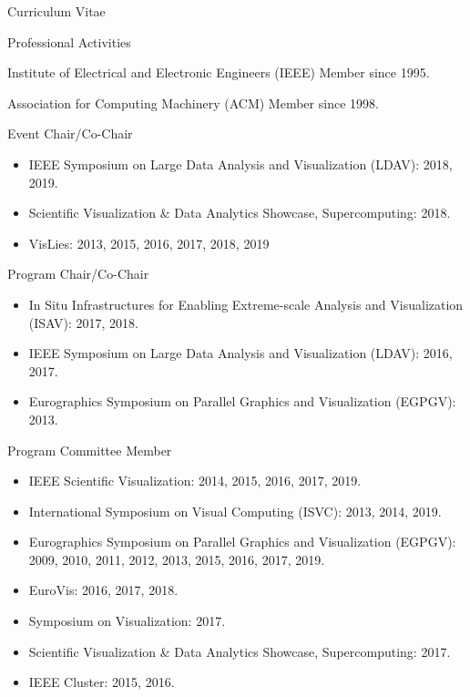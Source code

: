 \documentclass{article}
\begin{document}
\begin{cv}{Curriculum Vitae}
    \begin{cvlist}{Professional Activities}
    \item[Institute of Electrical and Electronic Engineers (IEEE)]
      Member since 1995.
    \item[Association for Computing Machinery (ACM)]  Member since 1998.
    \item[Event Chair/Co-Chair]~\\
      \begin{itemize}
      \item
        IEEE Symposium on Large Data Analysis and Visualization (LDAV): 2018, 2019.
      \item
        Scientific Visualization \& Data Analytics Showcase, Supercomputing: 2018.
      \item
        VisLies: 2013, 2015, 2016, 2017, 2018, 2019
      \end{itemize}
    \item[Program Chair/Co-Chair]~\\
      \begin{itemize}
      \item
        In Situ Infrastructures for Enabling Extreme-scale Analysis and Visualization (ISAV): 2017, 2018.
      \item
        IEEE Symposium on Large Data Analysis and Visualization (LDAV): 2016, 2017.
      \item
        Eurographics Symposium on Parallel Graphics and Visualization (EGPGV): 2013.
      \end{itemize}
    \item[Program Committee Member]~\\
      \begin{itemize}
      \item
        IEEE Scientific Visualization: 2014, 2015, 2016, 2017, 2019.
      \item
        International Symposium on Visual Computing (ISVC): 2013, 2014, 2019.
      \item
        Eurographics Symposium on Parallel Graphics and Visualization (EGPGV): 2009, 2010, 2011, 2012, 2013, 2015, 2016, 2017, 2019.
      \item
        EuroVis: 2016, 2017, 2018.
      \item
        Symposium on Visualization: 2017.
      \item
        Scientific Visualization \& Data Analytics Showcase, Supercomputing: 2017.
      \item
        IEEE Cluster: 2015, 2016.

\end{itemize}
\end{cvlist}
\end{cv}
\end{document}

